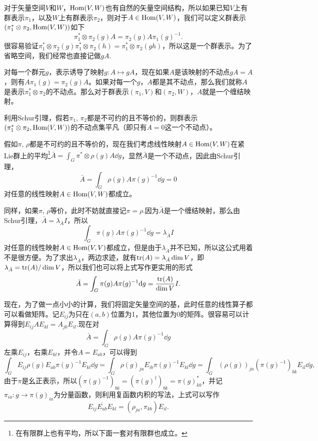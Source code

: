 \documentclass[9pt]{extarticle}
\begin{document}
\para 对于矢量空间$V$和$W$，$\operatorname{Hom}(V,W)$也有自然的矢量空间结构，所以如果已知$V$上有群表示$\pi_1$，以及$W$上有群表示$\pi_2$，则对于$A\in \operatorname{Hom}(V,W)$，我们可以定义群表示$(\pi_1^*\otimes\pi_2,\operatorname{Hom}(V,W))$如下
\[
	\pi_1^*\otimes\pi_2(g)A=\pi_2(g)A\pi_1(g)^{-1}.
\]
很容易验证$\pi_1^*\otimes\pi_2(g)\pi_1^*\otimes\pi_2(h)=\pi_1^*\otimes\pi_2(gh)$，所以这是一个群表示。为了省略空间，我们经常也直接记做$gA$.

对每一个群元$g$，表示诱导了映射$g:A\mapsto gA$，现在如果$A$是该映射的不动点$gA=A$，则有$A\pi_1(g)=\pi_2(g)A$。如果对每一个$g$，$A$都是其不动点，那么我们就称$A$是表示$\pi_1^*\otimes\pi_2$的不动点。那么对于群表示$(\pi_1,V)$和$(\pi_2,W)$，$A$就是一个缠结映射。

\para 利用Schur引理，假若$\pi_1$, $\pi_2$都是不可约的且不等价的，则群表示$(\pi_1^*\otimes\pi_2,\operatorname{Hom}(V,W))$的不动点集平凡（即只有$A=0$这一个不动点）。

假如$\pi$, $\rho$都是不可约的且不等价的，现在我们考虑线性映射$A\in \operatorname{Hom}(V,W)$在紧Lie群上的平均\footnote{在有限群上也有平均，所以下面一套对有限群也成立。}$\bar{A}=\int_G \pi^*\otimes\rho(g)A \dd g$，显然$\bar{A}$是一个不动点，因此由Schur引理，
\[
	\bar{A}=\int_G \rho(g)A\pi(g)^{-1}\dd g=0
\]
对任意的线性映射$A\in \operatorname{Hom}(V,W)$都成立。

同样，如果$\pi$, $\rho$等价，此时不妨就直接记$\pi=\rho$.因为$\bar{A}$是一个缠结映射，那么由Schur引理，$\bar{A}=\lambda_{\bar{A}} I$，所以
\[
	\int_G \pi(g)A\pi(g)^{-1}\dd g=\lambda_{\bar{A}} I
\]
对任意的线性映射$A\in \operatorname{Hom}(V,V)$都成立，但是由于$\lambda_{\bar{A}}$并不已知，所以这公式用着不是很方便。为了求出$\lambda_{\bar{A}}$，两边求迹，就有$\operatorname{tr}(A)=\lambda_{\bar{A}} \dim V$，即$\lambda_{\bar{A}}=\operatorname{tr}(A)/\dim V$，所以我们也可以将上式写作更实用的形式
\[
	\bar{A}=\int_G \pi(g)A\pi(g)^{-1}\mathrm{d} g=\frac{\operatorname{tr}(A)}{\dim V}I.
\]

\para 现在，为了做一点小小的计算，我们将固定矢量空间的基，此时任意的线性算子都可以看做矩阵。记$E_{ij}$为只在$(a,b)$位置为1，其他位置为0的矩阵。很容易可以计算得到$E_{ij}AE_{kl}=A_{jk}E_{il}$.现在对
\[
	\bar{A}=\int_G \rho(g)A\pi(g)^{-1}\dd g
\]
左乘$E_{ij}$，右乘$E_{kl}$，并令$A=E_{ab}$，可以得到
\[
	\int_G E_{ij}\rho(g)E_{ab}\pi(g)^{-1}E_{kl}\dd g=\int_G \rho(g)_{ja}E_{ib}\pi(g)^{-1}E_{kl}\dd g=\int_G (\rho(g))_{ja}\left(\pi(g)^{-1}\right)_{bk}E_{il}\dd g,
\]
由于$\pi$是幺正表示，所以$\left(\pi(g)^{-1}\right)_{bk}=\left(\pi(g)^{\dag}\right)_{bk}=\pi(g)_{kb}^*$，并记$\pi_{ia}:g\to \pi(g)_{ia}$为分量函数，则利用复函数内积的写法，上式可以写作
\[
	E_{ij}\overline{E_{ab}}E_{kl}=\left(\rho_{ja},\pi_{kb}\right)E_{il}.
\]
\end{document}
